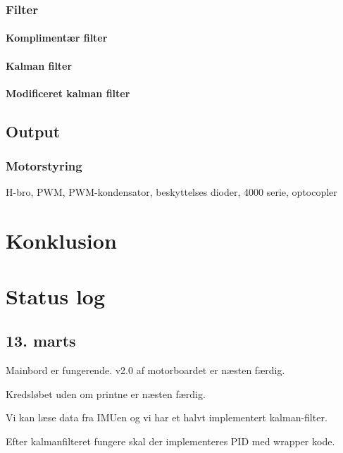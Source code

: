 \documentclass[a4paper,oneside,article,danish,table,draft]{memoir}
\begin{document}
\subsection{Filter}
\subsubsection{Komplimentær filter}
\subsubsection{Kalman filter}
\subsubsection{Modificeret kalman filter}

\section{Output}

\subsection{Motorstyring}
H-bro, PWM, PWM-kondensator, beskyttelses dioder, 4000 serie, optocopler


\chapter{Konklusion} \label{chap:kon}
\clearpage
\listoftables
\listoffigures
 
\clearpage \appendix

\chapter{Status log}

\section{13. marts}
Mainbord er fungerende. v2.0 af motorboardet er næsten færdig.

Kredsløbet uden om printne er næsten færdig.

Vi kan læse data fra IMUen og vi har et halvt implementert kalman-filter.

Efter kalmanfilteret fungere skal der implementeres PID med wrapper kode.
\end{document}
